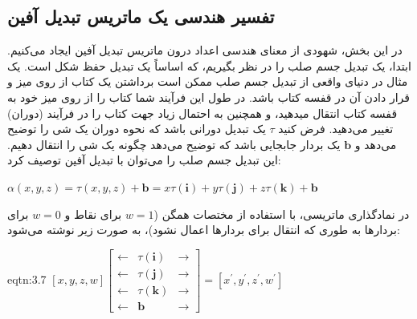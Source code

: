 \subsection{\textbf{تفسیر هندسی یک ماتریس تبدیل آفین}}
\label{subsec:3.2.5}
{
    \Large
    \begin{spacing}{1.5}
        در این بخش، شهودی از معنای هندسی اعداد درون ماتریس تبدیل آفین ایجاد می‌کنیم.
        ابتدا، یک تبدیل جسم صلب را در نظر بگیریم، که اساساً یک تبدیل حفظ شکل است.
        یک مثال در دنیای واقعی از تبدیل جسم صلب ممکن است برداشتن یک کتاب از روی میز و قرار دادن آن در قفسه کتاب باشد.
        در طول این فرآیند شما کتاب را از روی میز خود به قفسه کتاب انتقال میدهید، و همچنین به احتمال زیاد جهت کتاب را در فرآیند (دوران) تغییر می‌دهید.
        فرض کنید $\tau$ یک تبدیل دورانی باشد که نحوه دوران یک شی را توضیح می‌دهد و $\textbf{b}$ یک بردار جابجایی باشد که توضیح می‌دهد چگونه یک شی را انتقال دهیم. این تبدیل جسم صلب را می‌توان با تبدیل آفین توصیف کرد:

        \begin{center}
            $\alpha(x,y,z)=\tau(x,y,z)+\textbf{b}=x\tau(\textbf{i})+y\tau(\textbf{j})+z\tau(\textbf{k})+\textbf{b}$
        \end{center}

        در نمادگذاری ماتریسی، با استفاده از مختصات همگن ($w=1$ برای نقاط و $w=0$ برای بردارها به طوری که انتقال برای بردارها اعمال نشود)، به صورت زیر نوشته می‌شود:

        \begin{eqtn}{eqtn:3.7}
            \centering
            $[x,y,z,w]\begin{bmatrix}
                          \leftarrow & \tau(\textbf{i}) & \rightarrow \\
                          \leftarrow & \tau(\textbf{j}) & \rightarrow \\
                          \leftarrow & \tau(\textbf{k}) & \rightarrow \\
                          \leftarrow & \textbf{b}       & \rightarrow
            \end{bmatrix}=[x^\prime,y^\prime,z^\prime,w^\prime]$
        \end{eqtn}


\end{spacing}}
